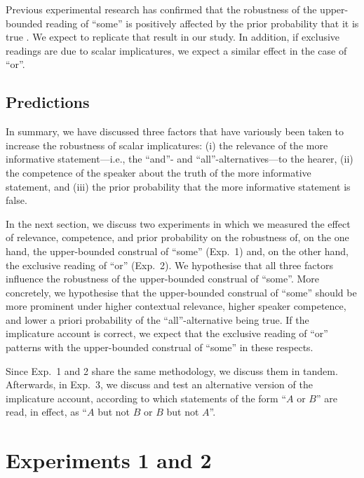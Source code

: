 \documentclass[12pt]{article}
\begin{document}
Previous experimental research has confirmed that the robustness of the upper-bounded reading of ``some'' is positively affected by the prior probability that it is true \citep{degen2015}. We expect to replicate that result in our study. In addition, if exclusive readings are due to scalar implicatures, we expect a similar effect in the case of ``or''.

\subsection*{Predictions}

In summary, we have discussed three factors that have variously been taken to increase the
robustness of scalar implicatures: (i) the relevance of the more informative statement---i.e., the ``and''- and ``all''-alternatives---to the hearer, (ii) the competence of the speaker about the
truth of the more informative statement, and (iii) the prior probability that the more
informative statement is false.

In the next section, we discuss two experiments in which we measured the effect of relevance,
competence, and prior probability on the robustness of, on the one hand, the upper-bounded
construal of ``some'' (Exp.\ 1) and, on the other hand, the exclusive reading of ``or'' (Exp.\
2). We hypothesise that all three factors influence the robustness of the upper-bounded
construal of ``some''. More concretely, we hypothesise that the upper-bounded construal of ``some''
should be more prominent under higher contextual relevance, higher speaker competence, and
lower a priori probability of the ``all''-alternative being true. If the implicature account is
correct, we expect that the exclusive reading of ``or'' patterns with the upper-bounded construal
of ``some'' in these respects.

Since Exp.\ 1 and 2 share the same methodology, we discuss them in tandem. Afterwards, in Exp.\ 3, we discuss and test an alternative version of the implicature account, according to which statements of the form ``$A$ or $B$'' are read, in effect, as ``$A$ but not $B$ or $B$ but not $A$''. 

\section{Experiments 1 and 2}
\end{document}
